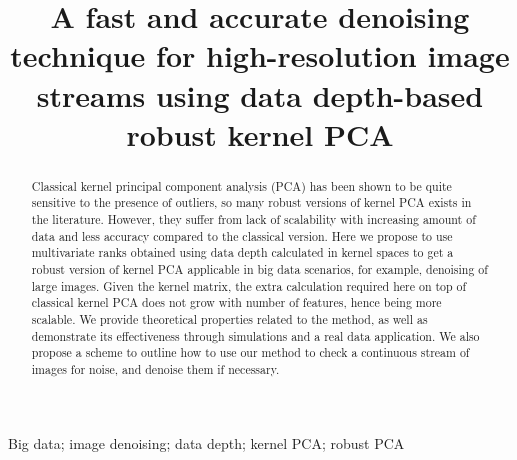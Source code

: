\documentclass[10pt, conference, compsocconf]{IEEEtran}
\title{\LARGE \bf
A fast and accurate denoising technique for high-resolution image streams using data depth-based robust kernel PCA
}
\begin{document}


\newtheorem{proposition}{Proposition}
\newtheorem{theorem}{Theorem}
\theoremstyle{definition} \newtheorem{definition}{Definition}

\author{
}

\maketitle
\thispagestyle{empty}
\pagestyle{empty}

\begin{abstract}

Classical kernel principal component analysis (PCA) has been shown to be quite sensitive to the presence of outliers, so many robust versions of kernel PCA exists in the literature. However, they suffer from lack of scalability with increasing amount of data and less accuracy compared to the classical version. Here we propose to use multivariate ranks obtained using data depth calculated in kernel spaces to get a robust version of kernel PCA applicable in big data scenarios, for example, denoising of large images. Given the kernel matrix, the extra calculation required here on top of classical kernel PCA does not grow with number of features, hence being more scalable. We provide theoretical properties related to the method, as well as demonstrate its effectiveness through simulations and a real data application. We also propose a scheme to outline how to use our method to check a continuous stream of images for noise, and denoise them if necessary.
\end{abstract}

\begin{IEEEkeywords}
Big data; image denoising; data depth; kernel PCA; robust PCA
\end{IEEEkeywords}

\end{document}
